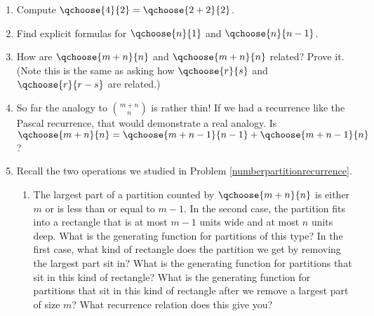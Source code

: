 \begin{enumerate}
\item Compute $\qchoose{4}{2}=\qchoose{2+2}{2}$.
\item Find  explicit formulas for $\qchoose{n}{1}$ and
$\qchoose{n}{n-1}$.
\item How are $\qchoose{m+n}{n}$ and $\qchoose{m+n}{n}$ related?  Prove
it.  (Note this is the same as asking how $\qchoose{r}{s}$ and
$\qchoose{r}{r-s}$ are related.)
\item So far the analogy to $m+n\choose n$ is rather thin!  If we had a
recurrence like the Pascal recurrence, that would demonstrate a real
analogy.  Is $\qchoose{m+n}{n}=
\qchoose{m+n-1}{n-1}+\qchoose{m+n-1}{n}$?
\item Recall the two operations we studied in Problem
\ref{numberpartitionrecurrence}.  
\begin{enumerate}
\item The largest part of a partition counted
by $\qchoose{m+n}{n}$ is either $m$ or is less than or equal to $m-1$. 
In the second case, the partition fits into a rectangle that is at most 
$m-1$ units wide and at most $n$ units deep.  What is the generating
function for partitions of this type?  In the first case, what kind of
rectangle does the partition we get by removing the largest part sit in? 
What is the generating function for partitions that sit in this kind of
rectangle?  What is the generating function for partitions that sit in
this kind of rectangle after we remove a largest part of size $m$?  What
recurrence relation does this give you?
\end{enumerate}
\end{enumerate}

